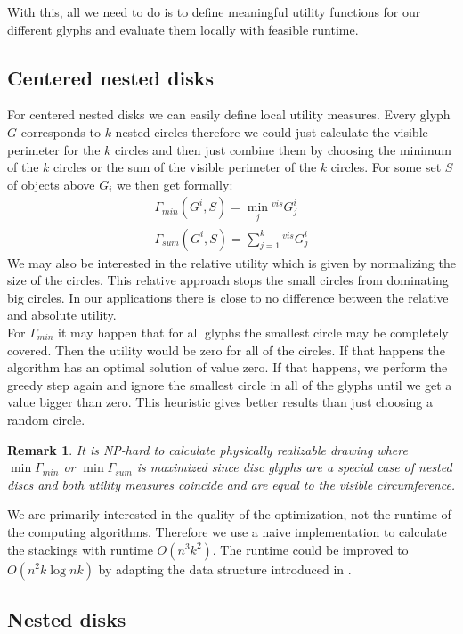 \documentclass[a4paper,11pt]{article}
\newtheorem*{remark}{Remark}
\begin{document}
With this, all we need to do is to define meaningful utility functions for our different glyphs and evaluate them locally with feasible runtime.

\subsection{Centered nested disks}
For centered nested disks we can easily define local utility measures. Every glyph $G$ corresponds to $k$ nested circles therefore we could just calculate the visible perimeter for the $k$ circles and then just combine them by choosing the minimum of the $k$ circles or the sum of the visible perimeter of the $k$ circles. For some set $S$ of objects above $G_i$ we then get formally:
\begin{align*}
  \Gamma_{min}({G^i,S})=\min_j  {^{vis} G^i_j} \\
  \Gamma_{sum}({G^i,S})=\sum_{j=1}^k  {^{vis} G^i_j}
\end{align*}
We may also be interested in the relative utility which is given by normalizing the size of the circles. This relative approach stops the small circles from dominating big circles. In our applications there is close to no difference between the relative and absolute utility.\\

For $\Gamma_{min}$ it may happen that for all glyphs the smallest circle may be completely covered. Then the utility would be zero for all of the circles. If that happens the algorithm has an optimal solution of value zero. If that happens, we perform the greedy step again and ignore the smallest circle in all of the glyphs until we get a value bigger than zero. This heuristic gives better results than just choosing a random circle.\\
%
\begin{remark}
It is NP-hard to calculate physically realizable drawing where $\min\Gamma_{min}$ or $\min\Gamma_{sum}$ is maximized since disc glyphs are a special case of nested discs and both utility measures coincide and are equal to the visible circumference.
\end{remark}
We are primarily interested in the quality of the optimization, not the runtime of the computing algorithms. Therefore we use a naive implementation to calculate the stackings with runtime $O(n^3k^2)$. The runtime could be improved to $O(n^2k \log nk)$ by adapting the data structure introduced in \cite{cabello}.


\subsection{Nested disks}
\end{document}

